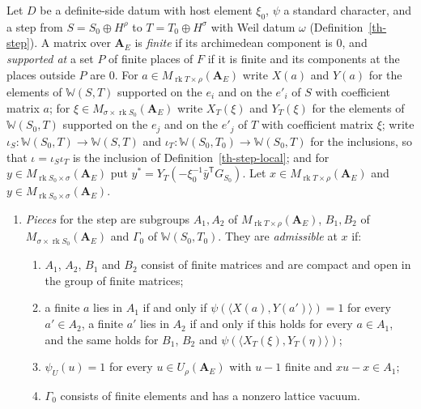\begin{definition}\label{th-standard-pieces}
Let $D$ be a definite-side datum with host element $\xi_0$, $\psi$ a standard
character, and a step from $S=S_0\oplus H^\rho$ to $T=T_0\oplus H^\sigma$ with
Weil datum $\omega$ (Definition~\ref{th-step}). A matrix over $\mathbf A_E$ is
\emph{finite} if its archimedean component is $0$, and \emph{supported at} a set
$P$ of finite places of $F$ if it is finite and its components at the places
outside $P$ are $0$. For $a\in M_{\operatorname{rk}T\times\rho}(\mathbf A_E)$
write $X(a)$ and $Y(a)$ for the elements of $\mathbb W(S,T)$ supported on the
$e_i$ and on the $e'_i$ of $S$ with coefficient matrix $a$; for
$\xi\in M_{\sigma\times\operatorname{rk}S_0}(\mathbf A_E)$ write $X_T(\xi)$ and
$Y_T(\xi)$ for the elements of $\mathbb W(S_0,T)$ supported on the $e_j$ and on
the $e'_j$ of $T$ with coefficient matrix $\xi$; write
$\iota_S\colon\mathbb W(S_0,T)\to\mathbb W(S,T)$ and
$\iota_T\colon\mathbb W(S_0,T_0)\to\mathbb W(S_0,T)$ for the inclusions, so that
$\iota=\iota_S\iota_T$ is the inclusion of Definition~\ref{th-step-local}; and for
$y\in M_{\operatorname{rk}S_0\times\sigma}(\mathbf A_E)$ put
$y^*=Y_T(-\xi_0^{-1}\bar y^{\mathsf T}G_{S_0})$. Let
$x\in M_{\operatorname{rk}T\times\rho}(\mathbf A_E)$ and
$y\in M_{\operatorname{rk}S_0\times\sigma}(\mathbf A_E)$.
\begin{enumerate}
\item \emph{Pieces} for the step are subgroups $A_1,A_2$ of
  $M_{\operatorname{rk}T\times\rho}(\mathbf A_E)$, $B_1,B_2$ of
  $M_{\sigma\times\operatorname{rk}S_0}(\mathbf A_E)$ and $\Gamma_0$ of
  $\mathbb W(S_0,T_0)$. They are \emph{admissible} at $x$ if:
  \begin{enumerate}
  \item[(a)] $A_1$, $A_2$, $B_1$ and $B_2$ consist of finite matrices and are
    compact and open in the group of finite matrices;
  \item[(b)] a finite $a$ lies in $A_1$ if and only if
    $\psi(\langle X(a),Y(a')\rangle)=1$ for every $a'\in A_2$, a finite $a'$ lies
    in $A_2$ if and only if this holds for every $a\in A_1$, and the same holds
    for $B_1$, $B_2$ and $\psi(\langle X_T(\xi),Y_T(\eta)\rangle)$;
  \item[(c)] $\psi_U(u)=1$ for every $u\in U_\rho(\mathbf A_E)$ with $u-1$
    finite and $xu-x\in A_1$;
  \item[(d)] $\Gamma_0$ consists of finite elements and has a nonzero lattice
    vacuum.
  \end{enumerate}

\end{enumerate}
\end{definition}
